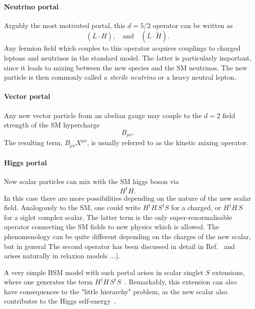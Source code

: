 \paragraph{Neutrino portal} 

Argubly the most motivated portal, this $d=5/2$ operator can be written as
\begin{equation}
 \left( \overline{L} \cdot H\right), \quad \mathrm{and}\quad \left( \overline{L} \cdot \tilde{H}\right).
\end{equation}
Any fermion field which couples to this operator acquires couplings to charged leptons and neutrinos in the standard model. The latter is particularly important, since it leads to mixing between the new species and the SM neutrinos. The new particle is then commonly called a \emph{sterile neutrino} or a heavy neutral lepton.

\paragraph{Vector portal}

Any new vector particle from an abelian gauge may couple to the $d=2$ field strength of the SM hypercharge
\begin{equation}
B_{\mu\nu}.
\end{equation}
The resulting term, $B_{\mu\nu} X^{\mu\nu}$, is usually referred to as the kinetic mixing operator.

\paragraph{Higgs portal}

New scalar particles can mix with the SM higgs boson via 
\begin{equation}
 H^\dagger H.
\end{equation}
In this case there are more possibilities depending on the nature of the new scalar field. Analogously to the SM, one could write  $H^\dagger H \, S^\dagger S$ for a charged, or $H^\dagger H\, S $ for a siglet complex scalar. The latter term is the only super-renormalisable operator connecting the SM fields to new physics which is allowed.  The phenomenology can be quite different depending on the charges of the new scalar, but in general The second operator has been discussed in detail in Ref.~\cite{Fradette:2018hhl} and arises naturally in relaxion models ...).

A very simple BSM model with such portal arises in scalar singlet $S$ extensions, where one generates the term $H^\dagger H \, S^\dagger S$~\cite{Silveira:1985rk}. Remarkably, this extension can also have consequences to the "little hierarchy" problem, as the new scalar also contributes to the Higgs self-energy~\cite{Craig:2013xia}.


